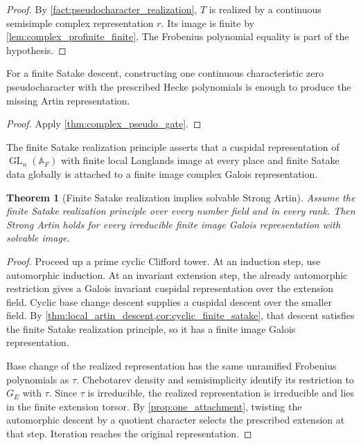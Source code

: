 \documentclass{aomart}
\newtheorem{theorem}{Theorem}[section]
\theoremstyle{definition}
\theoremstyle{remark}
\newcommand{\Adele}{\mathbb A}
\newcommand{\GL}{\operatorname{GL}}
\begin{document}
\begin{proof}
By \cref{fact:pseudocharacter_realization}, \(T\) is realized by a continuous semisimple complex representation \(r\). Its image is finite by \cref{lem:complex_profinite_finite}. The Frobenius polynomial equality is part of the hypothesis.
\end{proof}

\begin{corollary}\label{cor:pseudo_bottleneck}
For a finite Satake descent, constructing one continuous characteristic zero pseudocharacter with the prescribed Hecke polynomials is enough to produce the missing Artin representation.
\end{corollary}

\begin{proof}
Apply \cref{thm:complex_pseudo_gate}.
\end{proof}

\begin{definition}\label{def:finite_satake_principle}
The finite Satake realization principle asserts that a cuspidal representation of \(\GL_n(\Adele_F)\) with finite local Langlands image at every place and finite Satake data globally is attached to a finite image complex Galois representation.
\end{definition}

\begin{theorem}[Finite Satake realization implies solvable Strong Artin]\label{thm:FS_implies_solvable_artin}
Assume the finite Satake realization principle over every number field and in every rank. Then Strong Artin holds for every irreducible finite image Galois representation with solvable image.
\end{theorem}

\begin{proof}
Proceed up a prime cyclic Clifford tower. At an induction step, use automorphic induction. At an invariant extension step, the already automorphic restriction gives a Galois invariant cuspidal representation over the extension field. Cyclic base change descent supplies a cuspidal descent over the smaller field. By \cref{thm:local_artin_descent,cor:cyclic_finite_satake}, that descent satisfies the finite Satake realization principle, so it has a finite image Galois representation.

Base change of the realized representation has the same unramified Frobenius polynomials as \(\tau\). Chebotarev density and semisimplicity identify its restriction to \(G_E\) with \(\tau\). Since \(\tau\) is irreducible, the realized representation is irreducible and lies in the finite extension torsor. By \cref{prop:one_attachment}, twisting the automorphic descent by a quotient character selects the prescribed extension at that step. Iteration reaches the original representation.
\end{proof}
\end{document}

